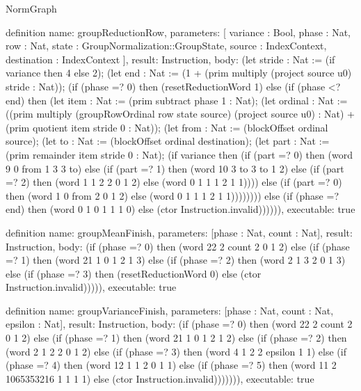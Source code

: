 \begin{lexlean}{NormGraph}
\begin{semanticmodule}
definition{
  name: groupReductionRow,
  parameters: [
    variance : Bool,
    phase : Nat,
    row : Nat,
    state : GroupNormalization::GroupState,
    source : IndexContext,
    destination : IndexContext
  ],
  result: Instruction,
  body: (let stride : Nat := (if variance then 4 else 2); (let end : Nat := (1 + (prim multiply (project source u0) stride : Nat)); (if (phase =? 0) then (resetReductionWord 1) else (if (phase <? end) then (let item : Nat := (prim subtract phase 1 : Nat); (let ordinal : Nat := ((prim multiply (groupRowOrdinal row state source) (project source u0) : Nat) + (prim quotient item stride 0 : Nat)); (let from : Nat := (blockOffset ordinal source); (let to : Nat := (blockOffset ordinal destination); (let part : Nat := (prim remainder item stride 0 : Nat); (if variance then (if (part =? 0) then (word 9 0 from 1 3 3 to) else (if (part =? 1) then (word 10 3 to 3 to 1 2) else (if (part =? 2) then (word 1 1 2 2 0 1 2) else (word 0 1 1 1 2 1 1)))) else (if (part =? 0) then (word 1 0 from 2 0 1 2) else (word 0 1 1 1 2 1 1)))))))) else (if (phase =? end) then (word 0 1 0 1 1 1 0) else (ctor Instruction.invalid)))))),
  executable: true
}

definition{
  name: groupMeanFinish,
  parameters: [phase : Nat, count : Nat],
  result: Instruction,
  body: (if (phase =? 0) then (word 22 2 count 2 0 1 2) else (if (phase =? 1) then (word 21 1 0 1 2 1 3) else (if (phase =? 2) then (word 2 1 3 2 0 1 3) else (if (phase =? 3) then (resetReductionWord 0) else (ctor Instruction.invalid))))),
  executable: true
}

definition{
  name: groupVarianceFinish,
  parameters: [phase : Nat, count : Nat, epsilon : Nat],
  result: Instruction,
  body: (if (phase =? 0) then (word 22 2 count 2 0 1 2) else (if (phase =? 1) then (word 21 1 0 1 2 1 2) else (if (phase =? 2) then (word 2 1 2 2 0 1 2) else (if (phase =? 3) then (word 4 1 2 2 epsilon 1 1) else (if (phase =? 4) then (word 12 1 1 2 0 1 1) else (if (phase =? 5) then (word 11 2 1065353216 1 1 1 1) else (ctor Instruction.invalid))))))),
  executable: true
}


\end{semanticmodule}
\end{lexlean}

